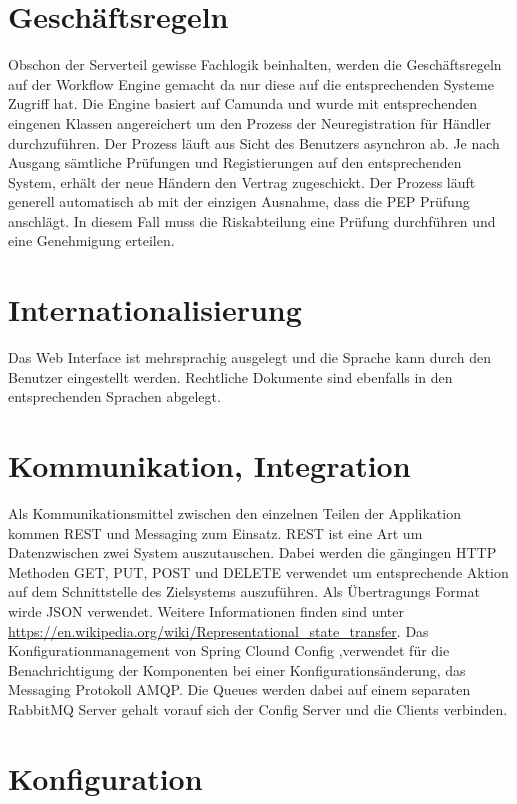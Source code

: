 \section{Geschäftsregeln}

Obschon der Serverteil gewisse Fachlogik beinhalten, werden die Geschäftsregeln auf der Workflow Engine gemacht da nur diese auf die entsprechenden Systeme Zugriff hat. Die Engine basiert auf Camunda und wurde mit entsprechenden eingenen Klassen angereichert um den Prozess der Neuregistration für Händler durchzuführen. Der Prozess läuft aus Sicht des Benutzers asynchron ab. Je nach Ausgang sämtliche Prüfungen und Registierungen auf den entsprechenden System, erhält der neue Händern den Vertrag zugeschickt. Der Prozess läuft generell automatisch ab mit der einzigen Ausnahme, dass die \gls{PEP} Prüfung anschlägt. In diesem Fall muss die Riskabteilung eine Prüfung durchführen und eine Genehmigung erteilen. 

\section{Internationalisierung}

Das Web Interface ist mehrsprachig ausgelegt und die Sprache kann durch den Benutzer eingestellt werden. Rechtliche Dokumente sind ebenfalls in den entsprechenden Sprachen abgelegt.

\section{Kommunikation, Integration}

Als Kommunikationsmittel zwischen den einzelnen Teilen der Applikation kommen \gls{REST} und Messaging zum Einsatz. REST ist eine Art um Datenzwischen zwei System auszutauschen. Dabei werden die gängingen HTTP Methoden GET, PUT, POST und DELETE verwendet um entsprechende Aktion auf dem Schnittstelle des Zielsystems auszuführen. Als Übertragungs Format wirde JSON verwendet. Weitere Informationen finden sind unter \url{https://en.wikipedia.org/wiki/Representational_state_transfer}.\newline
Das Konfigurationmanagement von Spring Clound Config ,verwendet für die Benachrichtigung der Komponenten bei einer Konfigurationsänderung, das Messaging Protokoll \Gls{AMQP}. Die Queues werden dabei auf einem separaten RabbitMQ Server gehalt vorauf sich der Config Server und die Clients verbinden.

\section{Konfiguration}
\label{config}

